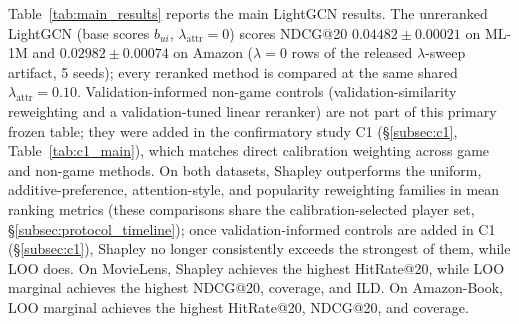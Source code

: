 \documentclass[pdflatex,sn-mathphys-num]{sn-jnl}
\begin{document}
Table~\ref{tab:main_results} reports the main LightGCN results. The unreranked LightGCN (base scores $b_{ui}$, $\lambda_{\text{attr}}=0$) scores NDCG@20 $0.04482\pm0.00021$ on ML-1M and $0.02982\pm0.00074$ on Amazon ($\lambda=0$ rows of the released $\lambda$-sweep artifact, 5 seeds); every reranked method is compared at the same shared $\lambda_{\text{attr}}=0.10$. Validation-informed non-game controls (validation-similarity reweighting and a validation-tuned linear reranker) are not part of this primary frozen table; they were added in the confirmatory study C1 (\S\ref{subsec:c1}, Table~\ref{tab:c1_main}), which matches direct calibration weighting across game and non-game methods. On both datasets, Shapley outperforms the uniform, additive-preference, attention-style, and popularity reweighting families in mean ranking metrics (these comparisons share the calibration-selected player set, \S\ref{subsec:protocol_timeline}); once validation-informed controls are added in C1 (\S\ref{subsec:c1}), Shapley no longer consistently exceeds the strongest of them, while LOO does. On MovieLens, Shapley achieves the highest HitRate@20, while LOO marginal achieves the highest NDCG@20, coverage, and ILD. On Amazon-Book, LOO marginal achieves the highest HitRate@20, NDCG@20, and coverage.
\end{document}
